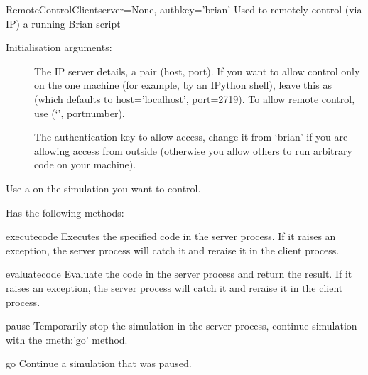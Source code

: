 \documentclass[letterpaper,10pt,english]{manual}
\begin{document}
\hypertarget{brian.RemoteControlClient}{}\begin{classdesc}{RemoteControlClient}{server=None, authkey='brian'}
Used to remotely control (via IP) a running Brian script

Initialisation arguments:
\begin{description}
\item[] \leavevmode
The IP server details, a pair (host, port). If you want to allow control
only on the one machine (for example, by an IPython shell), leave this
as  (which defaults to host='localhost', port=2719). To allow
remote control, use (`', portnumber).

\item[] \leavevmode
The authentication key to allow access, change it from `brian' if you
are allowing access from outside (otherwise you allow others to run
arbitrary code on your machine).

\end{description}

Use a \hyperlink{brian.RemoteControlServer}{} on the simulation you want to control.

Has the following methods:

\hypertarget{brian.RemoteControlClient.execute}{}\begin{methoddesc}{execute}{code}
Executes the specified code in the server process.
If it raises an
exception, the server process will catch it and reraise it in the
client process.
\end{methoddesc}

\hypertarget{brian.RemoteControlClient.evaluate}{}\begin{methoddesc}{evaluate}{code}
Evaluate the code in the server process and return the result.
If it raises an
exception, the server process will catch it and reraise it in the
client process.
\end{methoddesc}

\hypertarget{brian.RemoteControlClient.pause}{}\begin{methoddesc}{pause}{}
Temporarily stop the simulation in the server process, continue
simulation with the :meth:'go' method.
\end{methoddesc}

\hypertarget{brian.RemoteControlClient.go}{}\begin{methoddesc}{go}{}
Continue a simulation that was paused.
\end{methoddesc}


\end{classdesc}
\end{document}
